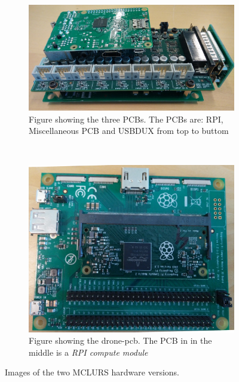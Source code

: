 \begin{figure}
    \centering
    \begin{subfigure}[b]{0.45\textwidth}
        \includegraphics[width=\textwidth]{figures/batbox}
        \caption{Figure showing the three PCBs. The PCBs are: RPI, Miscellaneous PCB and USBDUX from top to buttom}
        \label{fig:gull}
    \end{subfigure}
    ~ %
    \begin{subfigure}[b]{0.45\textwidth}
        \includegraphics[width=\textwidth]{figures/drone_pcb}
        \caption{Figure showing the drone-pcb. The PCB in in the middle is a \textit{RPI compute module}}
        \label{fig:mouse}
    \end{subfigure}
    \caption{Images of the two MCLURS hardware versions.}\label{fig:animals}
\end{figure}

